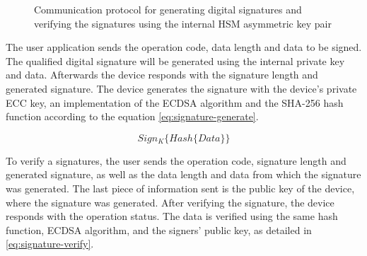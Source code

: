 \begin{figure}[h!]
	\centering     %
	\caption{Communication protocol for generating digital signatures and verifying the signatures using the internal HSM asymmetric key pair}
\end{figure}

The user application sends the operation code, data length and data to be signed.
The qualified digital signature will be generated using the internal private key and data. Afterwards the device responds with the signature length and generated signature.
The device generates the signature with the device's private ECC key, an implementation of the \ac{ECDSA} algorithm and the SHA-256 hash function according to the equation \ref{eq:signature-generate}.

\begin{equation}
	\label{eq:signature-generate}
	Sign_{K}\{Hash\{Data\}\}
\end{equation}

To verify a signatures, the user sends the operation code, signature length and generated signature, as well as the data length and data from which the signature was generated. The last piece of information sent is the public key of the device, where the signature was generated.
After verifying the signature, the device responds with the operation status.
The data is verified using the same hash function, ECDSA algorithm, and the signers' public key, as detailed in \ref{eq:signature-verify}.

